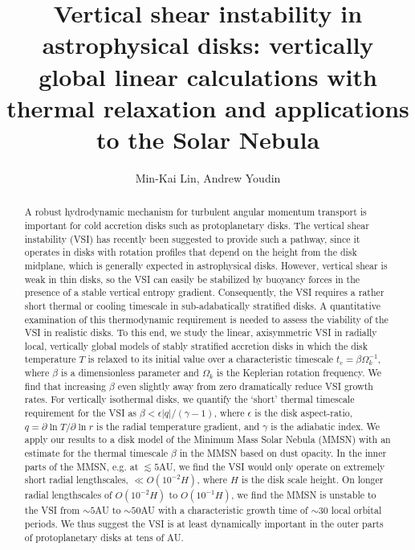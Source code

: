 \documentclass[iop]{emulateapj}
\newcommand{\p}{\partial}
\begin{document}
\title{Vertical shear instability in astrophysical disks: vertically global linear calculations with thermal relaxation and applications to the Solar Nebula} 
\author{Min-Kai Lin, Andrew Youdin}

\begin{abstract}
  A robust hydrodynamic mechanism for turbulent angular momentum
  transport is important for cold accretion disks such as 
  protoplanetary disks. The vertical shear instability (VSI) has 
  recently been suggested to provide such a pathway, since it operates in
  disks with rotation profiles that depend on the height from the 
  disk midplane, which is generally expected in  
  astrophysical disks. However, vertical shear is weak in thin disks, 
  so the VSI can easily be stabilized by buoyancy forces in the
  presence of a stable vertical entropy  gradient. %
  Consequently,  the VSI
  requires a rather short thermal or cooling timescale in
  sub-adabatically stratified disks.      
  A quantitative examination of this thermodynamic 
  requirement is needed to assess the viability of
  the VSI in realistic disks. To this end,  
  we study the linear, axisymmetric VSI in radially local, 
  vertically global models of stably stratified accretion disks in which the disk  
  temperature $T$ is relaxed to its initial value over a characteristic timescale 
  $t_c=\beta\Omega_k^{-1}$, where $\beta$ is a dimensionless parameter 
  and $\Omega_k$ is the Keplerian rotation frequency. %
  We find that 
  increasing $\beta$ even slightly away from    
  zero dramatically reduce VSI growth rates. 
  For vertically isothermal disks, we quantify the
  `short' thermal timescale requirement for the VSI as $\beta < \epsilon|q|/(\gamma-1)$, where
  $\epsilon$ is the disk aspect-ratio, $q = \p\ln T/\p\ln r$  is the radial temperature gradient, and 
  $\gamma$ is the adiabatic index. 
  We apply our results  
  to a disk model of the Minimum Mass Solar Nebula (MMSN) with an  
  estimate for the thermal timescale $\beta$ in the MMSN based on dust
  opacity. In the inner parts of the MMSN, e.g. at $\lesssim 5$AU, 
  we find the VSI would only operate on extremely short radial lengthscales, $\ll 
  O(10^{-2}H)$, where $H$ is the disk scale height. On longer radial 
  lengthscales of $O(10^{-2}H)$ to $O(10^{-1}H)$, we find the MMSN is
  unstable to the VSI from $\sim 5$AU to $\sim 50$AU with a
  characteristic growth time of $\sim 30$ local orbital periods.  
  We thus suggest the VSI is at least dynamically important in the 
  outer parts of protoplanetary disks at tens of AU. 
\end{abstract}
\end{document}
